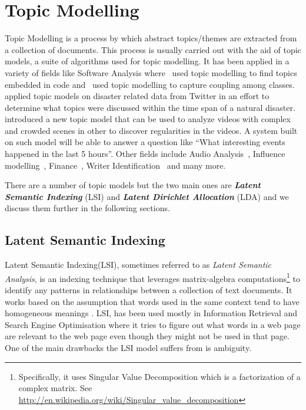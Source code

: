 \section{Topic Modelling}
\label{sec:bg_topic_modelling}
Topic Modelling is a process by which abstract topics/themes are extracted from a collection of
documents. This process is usually carried out with the aid of topic models, a suite of algorithms
used for topic modelling. It has been applied in a variety of fields like Software Analysis
where~\citet{linstead2009software} used topic modelling to find topics embedded in code
and~\citet{gethers2010using} used topic modelling to capture coupling among
classes.~\citet{kireyev2009applications} applied topic models on disaster related data from Twitter
in an effort to determine what topics were discussed within the time span of a natural
disaster.~\citet{hospedales2009markov} introduced a new topic model that can be used to analyze
videos with complex and crowded scenes in other to discover regularities in the videos. A system
built on such model will be able to answer a question like ``What interesting events happened in the
last 5 hours''. Other fields include Audio Analysis~\citep{smaragdis2009topic}, Influence
modelling~\citep{gerrish2009modeling}, Finance~\citep{doyle2009financial}, Writer
Identification~\citep{bhardwaj2009writer} and many more.

There are a number of topic models but the two main ones are \textbf{\textit{Latent Semantic
Indexing}} (LSI) and \textbf{\textit{Latent Dirichlet Allocation}} (LDA) and we discuss them further
in the following sections.


\subsection{Latent Semantic Indexing}
\label{sub:bg_lsa}
Latent Semantic Indexing(LSI), sometimes referred to as \textit{Latent Semantic Analysis}, is an
indexing technique that leverages matrix-algebra computations\footnote{Specifically, it uses Singular
Value Decomposition which is a factorization of a complex matrix. See
\url{http://en.wikipedia.org/wiki/Singular_value_decomposition}} to identify any patterns in
relationships between a collection of text documents. It works based on the assumption that words
used in the same context tend to have homogeneous meanings
\citep{deerwester1990indexing,dumais2004latent,landauer2006latent}. LSI, has been used mostly in
Information Retrieval and Search Engine Optimisation where it tries to figure out what words in a
web page are relevant to the web page even though they might not be used in that page. One of the
main drawbacks the LSI model suffers from is ambiguity.

